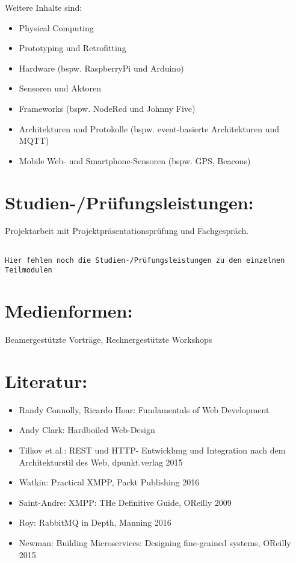 Weitere Inhalte sind:

\begin{itemize}
\item
  Physical Computing
\item
  Prototyping und Retrofitting
\item
  Hardware (bspw. RaspberryPi und Arduino)
\item
  Sensoren und Aktoren
\item
  Frameworks (bspw. NodeRed und Johnny Five)
\item
  Architekturen und Protokolle (bspw. event-basierte Architekturen und
  MQTT)
\item
  Mobile Web- und Smartphone-Sensoren (bspw. GPS, Beacons)
\end{itemize}

\section*{Studien-/Prüfungsleistungen:}\label{studien-pruxfcfungsleistungen-24}

Projektarbeit mit Projektpräsentationsprüfung und Fachgespräch.

\begin{verbatim}

Hier fehlen noch die Studien-/Prüfungsleistungen zu den einzelnen Teilmodulen
\end{verbatim}

\section*{Medienformen:}\label{medienformen-17}

Beamergestützte Vorträge, Rechnergestützte Workshops

\section*{Literatur:}\label{literatur-22}

\begin{itemize}
\item
  Randy Connolly, Ricardo Hoar: Fundamentals of Web Development
\item
  Andy Clark: Hardboiled Web-Design
\item
  Tilkov et al.: REST und HTTP- Entwicklung und Integration nach dem
  Architekturstil des Web, dpunkt.verlag 2015
\item
  Watkin: Practical XMPP, Packt Publishing 2016
\item
  Saint-Andre: XMPP: THe Definitive Guide, OReilly 2009
\item
  Roy: RabbitMQ in Depth, Manning 2016
\item
  Newman: Building Microservices: Designing fine-grained systems,
  OReilly 2015
\end{itemize}

